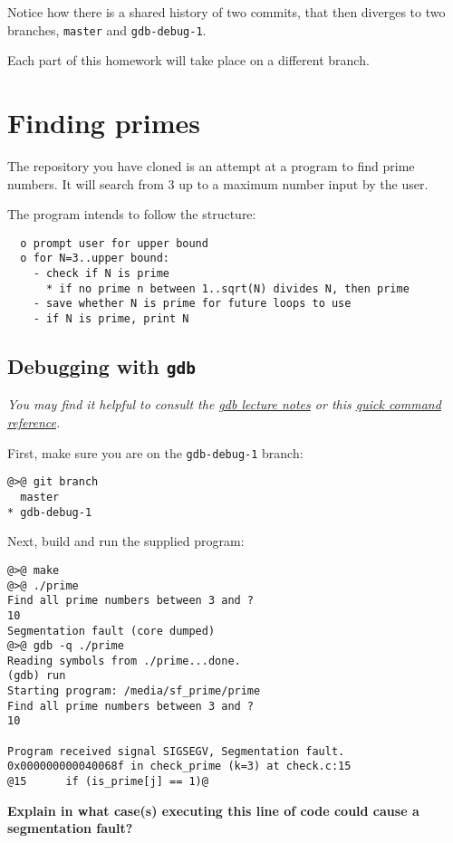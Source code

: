 \documentclass{article}
\begin{document}
Notice how there is a shared history of two commits, that then diverges to two
branches, \texttt{master} and \texttt{gdb-debug-1}.

Each part of this homework will take place on a different branch.

\section{Finding primes}

The repository you have cloned is an attempt at a program to find prime
numbers. It will search from 3 up to a maximum number input by the user.

The program intends to follow the structure:
\begin{lstlisting}
  o prompt user for upper bound
  o for N=3..upper bound:
    - check if N is prime
      * if no prime n between 1..sqrt(N) divides N, then prime
    - save whether N is prime for future loops to use
    - if N is prime, print N
\end{lstlisting}

\subsection{Debugging with \texttt{gdb}}

\emph{You may find it helpful to consult the
  \href{http://c4cs.github.io/static/lecture/wk7-gdb.pdf}{gdb lecture notes}
  or this
  \href{https://ccrma.stanford.edu/~jos/stkintro/Useful_commands_gdb.html}
  {quick command reference}.
}



First, make sure you are on the \texttt{gdb-debug-1} branch:
\begin{lstlisting}
@>@ git branch
  master
* gdb-debug-1
\end{lstlisting}

Next, build and run the supplied program:
\begin{lstlisting}
@>@ make
@>@ ./prime
Find all prime numbers between 3 and ?
10
Segmentation fault (core dumped)
@>@ gdb -q ./prime
Reading symbols from ./prime...done.
(gdb) run
Starting program: /media/sf_prime/prime 
Find all prime numbers between 3 and ?
10

Program received signal SIGSEGV, Segmentation fault.
0x000000000040068f in check_prime (k=3) at check.c:15
@15      if (is_prime[j] == 1)@
\end{lstlisting}

\textbf{Explain in what case(s) executing this line of code could cause a
  segmentation fault?}
\vspace{3cm}
\end{document}
